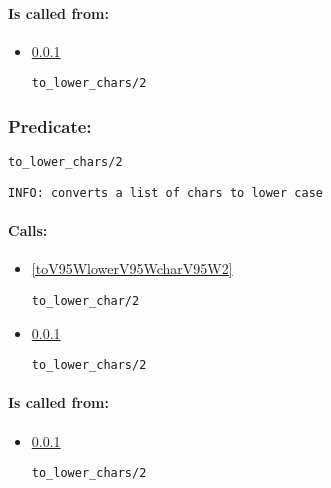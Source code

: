 \paragraph{Is called from:} 
\begin{itemize}
\item \ref{toV95WlowerV95WcharsV95W2} 
\begin{verbatim}
to_lower_chars/2
\end{verbatim}

\end{itemize}

\subsubsection{Predicate:} \label{toV95WlowerV95WcharsV95W2}

\begin{verbatim}
to_lower_chars/2
\end{verbatim}

{\small \begin{verbatim}
INFO: converts a list of chars to lower case

\end{verbatim}}
\paragraph{Calls:} 
\begin{itemize}
\item \ref{toV95WlowerV95WcharV95W2} 
\begin{verbatim}
to_lower_char/2
\end{verbatim}

\item \ref{toV95WlowerV95WcharsV95W2} 
\begin{verbatim}
to_lower_chars/2
\end{verbatim}

\end{itemize}
\paragraph{Is called from:} 
\begin{itemize}
\item \ref{toV95WlowerV95WcharsV95W2} 
\begin{verbatim}
to_lower_chars/2
\end{verbatim}

\end{itemize}

